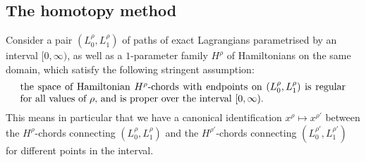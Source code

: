 \documentclass{article}
\theoremstyle{plain}%
\theoremstyle{definition}
\numberwithin{equation}{section}
\numberwithin{figure}{section}
\def\e#1\e{\begin{equation}#1\end{equation}}
\def\eq{\eqref}
\def\l{\label}
\def\cA{{\mathbin{\cal A}}}
\def\cE{{\mathbin{\cal E}}}
\def\R{{\mathbin{\mathbb R}}}
\def\la{\lambda}
\def\Si{\Sigma}
\def\cm{\circ}
\begin{document}



\subsection{The homotopy method}
\label{sec:homotopy-method}

Consider a pair $(L^{\rho}_0, L^{\rho}_1)$ of paths of exact Lagrangians parametrised by an interval $[0,\infty)$, as well as a $1$-parameter family $H^{\rho}$ of Hamiltonians on the same domain, which satisfy the following stringent assumption:
\begin{equation}
  \parbox{33em}{the space of Hamiltonian $H^\rho$-chords with endpoints on $(L^{\rho}_0, L^{\rho}_1)$ is regular for all values of $\rho$, and is proper over the interval $[0,\infty)$.}  
\end{equation}
This means in particular that we have a canonical identification $x^{\rho} \mapsto x^{\rho'}$ between the $H^\rho$-chords connecting  $(L^{\rho}_0, L^{\rho}_1)$ and the $H^{\rho'}$-chords connecting  $(L^{\rho'}_0, L^{\rho'}_1)$ for different points in the interval.
\end{document}
